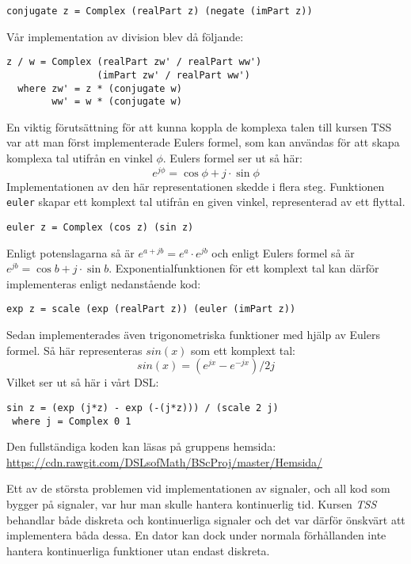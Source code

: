 \documentclass[]{article}
\begin{document}
\begin{verbatim}
conjugate z = Complex (realPart z) (negate (imPart z))
\end{verbatim}
Vår implementation av division blev då följande:
\begin{verbatim}
z / w = Complex (realPart zw' / realPart ww')
                (imPart zw' / realPart ww')
  where zw' = z * (conjugate w)
        ww' = w * (conjugate w)
\end{verbatim}

En viktig förutsättning för att kunna koppla de komplexa talen till
kursen TSS var att man först implementerade Eulers formel, som kan
användas för att skapa komplexa tal utifrån en vinkel \(\phi\). Eulers
formel ser ut så här:
\[e^{j\phi}=\cos \phi+ j \cdot \sin \phi \]
Implementationen av den här representationen skedde i flera steg.
Funktionen \texttt{euler} skapar ett komplext tal utifrån
en given vinkel, representerad av ett flyttal.
\begin{verbatim}
euler z = Complex (cos z) (sin z)
\end{verbatim}
Enligt potenslagarna %
så är \(e^{a+jb} = e^{a} \cdot e^{jb}\) och enligt Eulers formel så är
\(e^{j b} = \cos b + j\cdot \sin b\).
%
Exponentialfunktionen för ett komplext tal kan därför implementeras
enligt nedanstående kod:

\begin{verbatim}
exp z = scale (exp (realPart z)) (euler (imPart z))
\end{verbatim}
Sedan implementerades även trigonometriska funktioner med hjälp av
Eulers formel. Så här representeras $sin(x)$ som ett komplext tal:
\[ sin(x) = (e^{j x} - e^{-j x}) / 2 j \]
Vilket ser ut så här i vårt DSL:
\begin{verbatim}
sin z = (exp (j*z) - exp (-(j*z))) / (scale 2 j)
 where j = Complex 0 1
\end{verbatim}

Den fullständiga koden kan läsas på gruppens hemsida:
\url{https://cdn.rawgit.com/DSLsofMath/BScProj/master/Hemsida/}

Ett av de största problemen vid implementationen av signaler, och all
kod som bygger på signaler, var hur man skulle hantera kontinuerlig
tid. Kursen \textit{TSS} behandlar både diskreta och kontinuerliga
signaler och det var därför önskvärt att implementera båda dessa. En
dator kan dock under normala förhållanden inte hantera kontinuerliga 
funktioner utan endast diskreta. %
\end{document}

